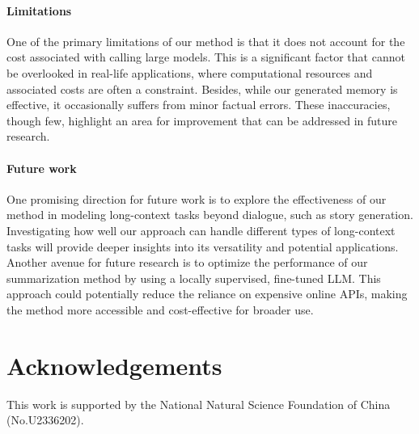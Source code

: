\documentclass[authoryear,preprint,review,12pt]{elsarticle}
\begin{document}
\paragraph{Limitations}
One of the primary limitations of our method is that it does not account for the cost associated with calling large models. This is a significant factor that cannot be overlooked in real-life applications, where computational resources and associated costs are often a constraint. Besides, while our generated memory is effective, it occasionally suffers from minor factual errors. These inaccuracies, though few, highlight an area for improvement that can be addressed in future research.

\paragraph*{Future work} One promising direction for future work is to explore the effectiveness of our method in modeling long-context tasks beyond dialogue, such as story generation. Investigating how well our approach can handle different types of long-context tasks will provide deeper insights into its versatility and potential applications. Another avenue for future research is to optimize the performance of our summarization method by using a locally supervised, fine-tuned LLM. This approach could potentially reduce the reliance on expensive online APIs, making the method more accessible and cost-effective for broader use.
\section{Acknowledgements}
This work is supported by the National Natural Science Foundation
of China (No.U2336202).

\appendix
\end{document}
